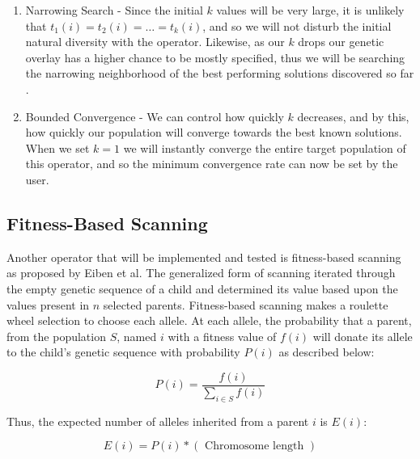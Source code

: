 \begin{enumerate}

\item Narrowing Search - Since the initial $k$ values will be very large, it is unlikely that $t_1(i) = t_2(i) = \ldots = t_k(i)$, and so we will not disturb the initial natural diversity with the operator.  Likewise, as our $k$ drops our genetic overlay has a higher chance to be mostly specified, thus we will be searching the narrowing neighborhood of the best performing solutions discovered so far \cite{Neri11}.

\item Bounded Convergence - We can control how quickly $k$ decreases, and by this, how quickly our population will converge towards the best known solutions. When we set $k=1$ we will instantly converge the entire target population of this operator, and so the minimum convergence rate can now be set by the user.

\end{enumerate}

\subsection*{Fitness-Based Scanning}
Another operator that will be implemented and tested is fitness-based scanning as proposed by Eiben et al\cite{Eiben94}. The generalized form of scanning iterated through the empty genetic sequence of a child and determined its value based upon the values present in $n$ selected parents\cite{Eiben91}. Fitness-based scanning makes a roulette wheel selection to choose each allele. At each allele, the probability that a parent, from the population $S$, named $i$ with a fitness value of $f(i)$ will donate its allele to the child's genetic sequence with probability $P(i)$ as described below\cite{Eiben94}:

\[ P(i) = \frac{f(i)}{\sum\limits_{i \in S} f(i)} \]

Thus, the expected number of alleles inherited from a parent $i$ is $E(i)$\cite{Eiben94}:

\[ E(i) = P(i) *(\text{ Chromosome length }) \]

